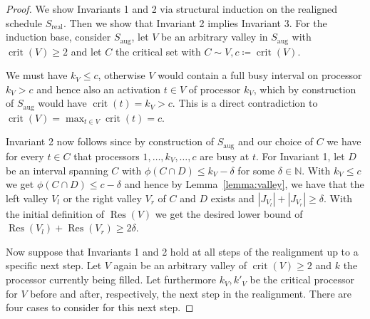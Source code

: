 \documentclass[a4paper]{article}
\DeclareMathOperator{\aug}{aug}
\DeclareMathOperator{\real}{real}
\DeclareMathOperator{\crit}{crit}
\DeclareMathOperator{\fillop}{fill}
\DeclareMathOperator{\res}{Res}
\begin{document}
\begin{proof}
  We show Invariants 1 and 2 via structural induction on the realigned schedule $S_{\real}$.
  Then we show that Invariant 2 implies Invariant 3.
  For the induction base, consider $S_{\aug}$, let $V$ be an arbitrary valley in $S_{\aug}$ with $\crit(V) \geq 2$ and let $C$ the critical set with $C \sim V, c \coloneqq \crit(V)$.

  We must have $k_V \leq c$, otherwise $V$ would contain a full busy interval on processor $k_V > c$ and hence also an activation $t \in V$ of processor $k_V$, which by construction of $S_{\aug}$ would have $\crit(t) = k_V > c$.
  This is a direct contradiction to $\crit(V) = \max_{t \in V} \crit(t) = c$.

  Invariant 2 now follows since by construction of $S_{\aug}$ and our choice of $C$ we have for every $t \in C$ that processors $1, \ldots, k_V, \ldots, c$ are busy at $t$. For Invariant 1, let $D$ be an interval spanning $C$ with $\phi(C \cap D) \leq k_V - \delta$ for some $\delta \in \mathbb{N}$.
  With $k_V \leq c$ we get $\phi(C \cap D) \leq c - \delta$ and hence by Lemma~\ref{lemma:valley}, we have that the left valley $V_l$ or the right valley $V_r$ of $C$ and $D$ exists and $|J_{V_l}| + |J_{V_r}| \geq \delta$.
  With the initial definition of $\res(V)$ we get the desired lower bound of $\res(V_l) + \res(V_r) \geq 2 \delta$.

  Now suppose that Invariants 1 and 2 hold at all steps of the realignment up to a specific next step.
  Let $V$ again be an arbitrary valley of $\crit(V) \geq 2$ and $k$ the processor currently being filled.
  Let furthermore $k_V, k'_V$ be the critical processor for $V$ before and after, respectively, the next step in the realignment.
  There are four cases to consider for this next step.


\end{proof}
\end{document}
